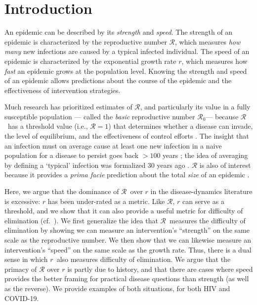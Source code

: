 \documentclass[12pt]{article}
\newcommand{\RR}{\ensuremath{{\mathcal R}}}
\newcommand{\Rx}[1]{\ensuremath{\RR_{\mathrm{#1}}}}
\newcommand{\Ro}{\Rx{0}}
\newcommand{\rr}{\ensuremath{{r}}}
\begin{document}
\pagebreak

\section{Introduction}

An epidemic can be described by its \emph{strength} and \emph{speed}.
The strength of an epidemic is characterized by the reproductive number \RR, which measures \emph{how many} new infections are caused by a typical infected individual.
The speed of an epidemic is characterized by the exponential growth rate $r$, which measures how \emph{fast} an epidemic grows at the population level.
Knowing the strength and speed of an epidemic allows predictions about the course of the epidemic and the effectiveness of intervention strategies.

Much research has prioritized estimates of \RR, and particularly its value in a fully susceptible population --- called the \emph{basic} reproductive number \Ro --- because \RR\ has a threshold value (i.e., $\RR=1$) that determines whether a disease can invade, the level of equilibrium, and the effectiveness of control efforts \citep{anderson1991infectious, diekmann1990definition}.
The insight that an infection must on average cause at least one new infection in a naive population for a disease to persist goes back $>100$ years \citep{ross1911prevention}; 
the idea of averaging by defining a `typical' infection was formalized 30 years ago \citep{diekmann1990definition}.
$\RR$ is also of interest because it provides a \emph{prima facie} prediction about the total \emph{size} of an epidemic \citep{anderson1991infectious, ma2006generality, arino2007final, andreasen2011final, miller2012note}.

Here, we argue that the dominance of \RR\ over $r$ in the disease-dynamics literature is excessive: $r$ has been under-rated as a metric. Like \RR,  $r$ can serve as a threshold, and we show that it can also provide a useful metric for difficulty of elimination (cf.~\cite{ferretti2020quantifying}). 
We first generalize the idea that \RR\ measures the difficulty of elimination by showing we can measure an intervention's ``strength'' on the same scale as the reproductive number. 
We then show that we can likewise measure an intervention's ``speed'' on the same scale as the growth rate.
Thus, there is a dual sense in which \rr\ also measures difficulty of elimination. 
We argue that the primacy of $\RR$ over $r$ is partly due to history, and that there are cases where speed provides the better framing for practical disease questions than strength (as well as the reverse). We provide examples of both situations, for both HIV and COVID-19.
\end{document}
